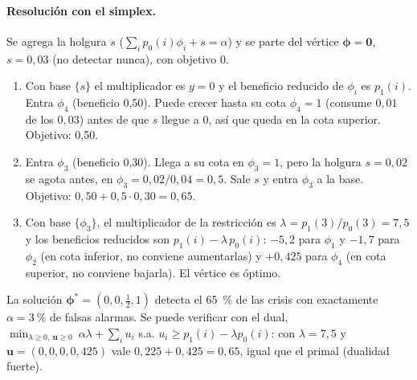 \paragraph{Resolución con el simplex.} Se agrega la holgura $s$ ($\sum_i p_0(i)\phi_i + s = \alpha$) y se parte del
vértice $\boldsymbol\phi = \mathbf{0}$, $s = 0{,}03$ (no detectar nunca), con objetivo 0.
\begin{enumerate}
  \item Con base $\{s\}$ el multiplicador es $y = 0$ y el beneficio reducido de $\phi_i$ es $p_1(i)$. Entra
        $\phi_4$ (beneficio 0,50). Puede crecer hasta su cota $\phi_4 = 1$ (consume $0{,}01$ de los $0{,}03$) antes de
        que $s$ llegue a 0, así que queda en la cota superior. Objetivo: 0,50.
  \item Entra $\phi_3$ (beneficio 0,30). Llega a su cota en $\phi_3 = 1$, pero la holgura $s = 0{,}02$ se agota
        antes, en $\phi_3 = 0{,}02/0{,}04 = 0{,}5$. Sale $s$ y entra $\phi_3$ a la base. Objetivo:
        $0{,}50 + 0{,}5\cdot 0{,}30 = 0{,}65$.
  \item Con base $\{\phi_3\}$, el multiplicador de la restricción es $\lambda = p_1(3)/p_0(3) = 7{,}5$ y los beneficios
        reducidos son $p_1(i) - \lambda\,p_0(i)$: $-5{,}2$ para $\phi_1$ y $-1{,}7$ para $\phi_2$ (en cota inferior,
        no conviene aumentarlas) y $+0{,}425$ para $\phi_4$ (en cota superior, no conviene bajarla). El vértice es
        óptimo.
\end{enumerate}
La solución $\boldsymbol\phi^* = (0, 0, \tfrac12, 1)$ detecta el 65~\% de las crisis con exactamente $\alpha = 3~\%$ de
falsas alarmas. Se puede verificar con el dual, $\min_{\lambda \ge 0,\ \mathbf{u} \ge 0}\ \alpha\lambda + \sum_i u_i$ s.a.
$u_i \ge p_1(i) - \lambda p_0(i)$: con $\lambda = 7{,}5$ y $\mathbf{u} = (0, 0, 0, 0{,}425)$ vale
$0{,}225 + 0{,}425 = 0{,}65$, igual que el primal (dualidad fuerte).

